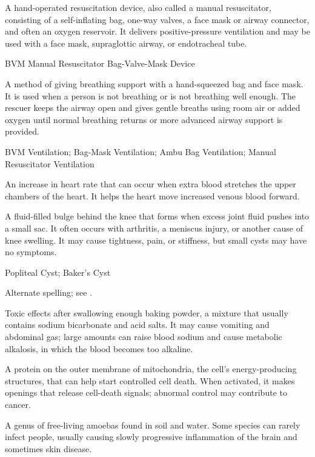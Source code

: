  A hand-operated resuscitation device, also called a manual resuscitator, consisting of a self-inflating bag, one-way valves, a face mask or airway connector, and often an oxygen reservoir. It delivers positive-pressure ventilation and may be used with a face mask, supraglottic airway, or endotracheal tube.

\synonyms
BVM
Manual Resuscitator
Bag-Valve-Mask Device

 A method of giving breathing support with a hand-squeezed bag and face mask. It is used when a person is not breathing or is not breathing well enough. The rescuer keeps the airway open and gives gentle breaths using room air or added oxygen until normal breathing returns or more advanced airway support is provided.

\synonyms
BVM Ventilation; Bag-Mask Ventilation; Ambu Bag Ventilation; Manual Resuscitator Ventilation

 An increase in heart rate that can occur when extra blood stretches the upper chambers of the heart. It helps the heart move increased venous blood forward.

 A fluid-filled bulge behind the knee that forms when excess joint fluid pushes into a small sac. It often occurs with arthritis, a meniscus injury, or another cause of knee swelling. It may cause tightness, pain, or stiffness, but small cysts may have no symptoms.

\synonyms
Popliteal Cyst; Baker's Cyst

 Alternate spelling; see .

 Toxic effects after swallowing enough baking powder, a mixture that usually contains sodium bicarbonate and acid salts. It may cause vomiting and abdominal gas; large amounts can raise blood sodium and cause metabolic alkalosis, in which the blood becomes too alkaline.

 A protein on the outer membrane of mitochondria, the cell’s energy-producing structures, that can help start controlled cell death. When activated, it makes openings that release cell-death signals; abnormal control may contribute to cancer.

 A genus of free-living amoebas found in soil and water. Some species can rarely infect people, usually causing slowly progressive inflammation of the brain and sometimes skin disease.

